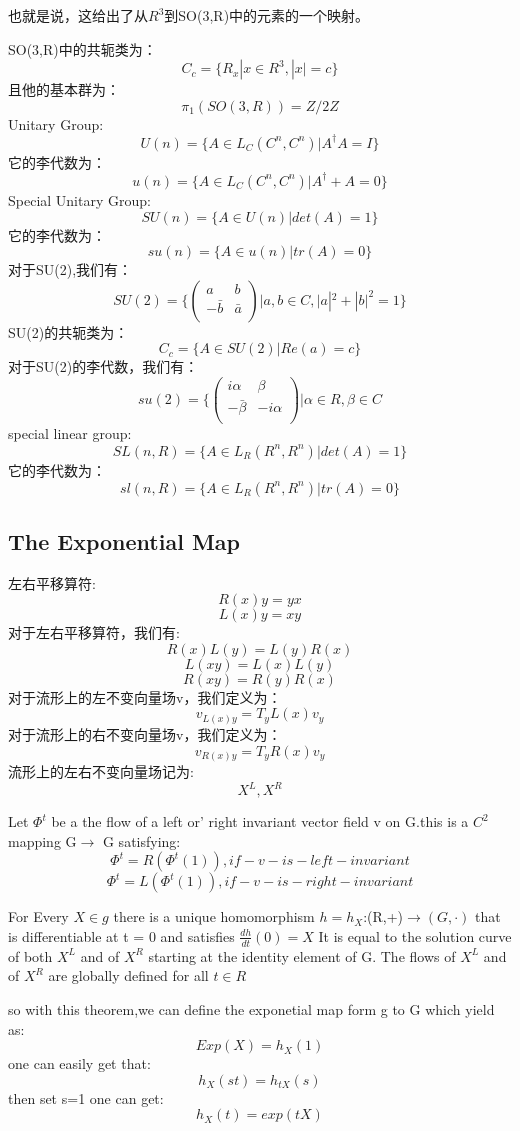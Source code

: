 也就是说，这给出了从$R^3$到SO(3,R)中的元素的一个映射。\par
SO(3,R)中的共轭类为：
\[C_c=\{R_x|x\in R^3,|x|=c\}\]
且他的基本群为：
\[\pi_1(SO(3,R))=Z/2Z\]
Unitary Group:
\[U(n)=\{A\in L_C(C^n,C^n)|A^\dagger A=I\}\]
它的李代数为：
\[u(n)=\{A\in L_C(C^n,C^n)|A^\dagger+A=0\}\]
Special Unitary Group:
\[SU(n)=\{A\in U(n)|det(A)=1\}\]
它的李代数为：
\[su(n)=\{A\in u(n)|tr(A)=0\}\]
对于SU(2),我们有：
\[SU(2)=\{\left(\begin{array}{cc}a&b\\-\bar{b}&\bar{a}\\\end{array}\right)|a,b\in C,|a|^2+|b|^2=1\}\]
SU(2)的共轭类为：
\[C_c=\{A\in SU(2)|Re(a)=c\}\]
对于SU(2)的李代数，我们有：
\[su(2)=\{\left(\begin{array}{cc}i\alpha&\beta\\-\bar{\beta}&-i\alpha\\\end{array}\right)|\alpha\in R,\beta\in C\]
special linear group:
\[SL(n,R)=\{A\in L_R(R^n,R^n)|det(A)=1\}\]
它的李代数为：
\[sl(n,R)=\{A\in L_R(R^n,R^n)|tr(A)=0\}\]

\subsection{The Exponential Map}
左右平移算符:
\[R(x)y=yx\]
\[L(x)y=xy\]
对于左右平移算符，我们有:
\[R(x)L(y)=L(y)R(x)\]
\[L(xy)=L(x)L(y)\]
\[R(xy)=R(y)R(x)\]
对于流形上的左不变向量场v，我们定义为：
\[v_{L(x)y}=T_yL(x)v_y\]
对于流形上的右不变向量场v，我们定义为：
\[v_{R(x)y}=T_yR(x)v_y\]
流形上的左右不变向量场记为:
\[X^L,X^R\]
\begin{lemma}
Let $\Phi^t$ be a  the flow of a left or' right invariant vector field v on G.this is a $C^2$ mapping G$\rightarrow$ G satisfying:
\[\Phi^t=R(\Phi^t(1)),if-v-is-left-invariant\]
\[\Phi^t=L(\Phi^t(1)),if-v-is-right-invariant\]
\end{lemma}
\begin{theorem}
For Every $X\in g$ there is a unique homomorphism $h=h_X$:(R,+)$\rightarrow (G,\cdot)$ that is differentiable at t = 0 and satisfies $\frac{dh}{dt}(0)=X$ It is equal to the solution curve of both $X^L$ and of $X^R$ starting at the identity element of G. The flows of $X^L$ and of $X^R$ are globally defined for all $t \in R$
\end{theorem}
so with this theorem,we can define the exponetial map form g to G which yield as:
\[Exp(X)=h_X(1)\]
one can easily get that:
\[h_X(st)=h_{tX}(s)\]
then set s=1 one can get:
\[h_X(t)=exp(tX)\]
